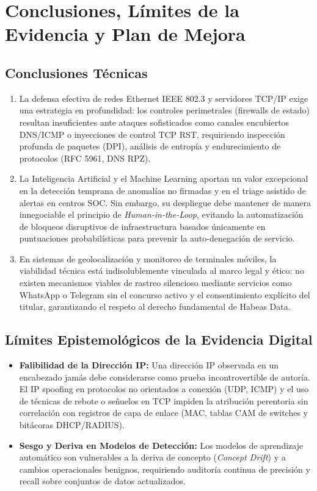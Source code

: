 \documentclass[11pt,letterpaper]{article}
\begin{document}
\newpage
\section{Conclusiones, Límites de la Evidencia y Plan de Mejora}

\subsection{Conclusiones Técnicas}
\begin{enumerate}
    \item La defensa efectiva de redes Ethernet IEEE 802.3 y servidores TCP/IP exige una estrategia en profundidad: los controles perimetrales (firewalls de estado) resultan insuficientes ante ataques sofisticados como canales encubiertos DNS/ICMP o inyecciones de control TCP RST, requiriendo inspección profunda de paquetes (DPI), análisis de entropía y endurecimiento de protocolos (RFC 5961, DNS RPZ).
    \item La Inteligencia Artificial y el Machine Learning aportan un valor excepcional en la detección temprana de anomalías no firmadas y en el triage asistido de alertas en centros SOC. Sin embargo, su despliegue debe mantener de manera innegociable el principio de \textit{Human-in-the-Loop}, evitando la automatización de bloqueos disruptivos de infraestructura basados únicamente en puntuaciones probabilísticas para prevenir la auto-denegación de servicio.
    \item En sistemas de geolocalización y monitoreo de terminales móviles, la viabilidad técnica está indisolublemente vinculada al marco legal y ético: no existen mecanismos viables de rastreo silencioso mediante servicios como WhatsApp o Telegram sin el concurso activo y el consentimiento explícito del titular, garantizando el respeto al derecho fundamental de Habeas Data.
\end{enumerate}

\subsection{Límites Epistemológicos de la Evidencia Digital}
\begin{itemize}
    \item \textbf{Falibilidad de la Dirección IP:} Una dirección IP observada en un encabezado jamás debe considerarse como prueba incontrovertible de autoría. El IP spoofing en protocolos no orientados a conexión (UDP, ICMP) y el uso de técnicas de rebote o señuelos en TCP impiden la atribución perentoria sin correlación con registros de capa de enlace (MAC, tablas CAM de switches y bitácoras DHCP/RADIUS).
    \item \textbf{Sesgo y Deriva en Modelos de Detección:} Los modelos de aprendizaje automático son vulnerables a la deriva de concepto (\textit{Concept Drift}) y a cambios operacionales benignos, requiriendo auditoría continua de precisión y recall sobre conjuntos de datos actualizados.
\end{itemize}
\end{document}
